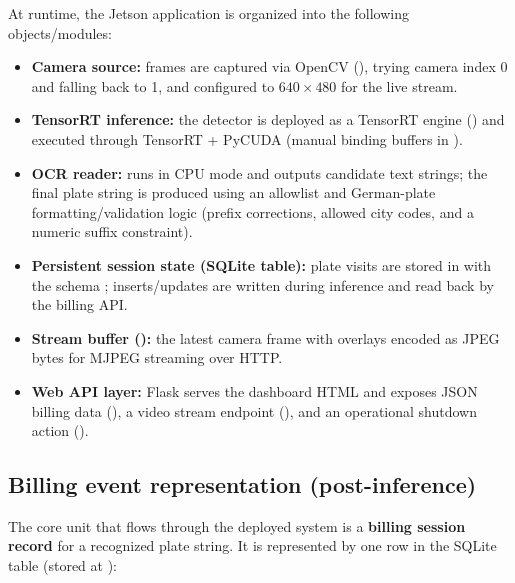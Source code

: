 \noindent
At runtime, the Jetson application is organized into the following objects/modules:
\begin{itemize}
	\item \textbf{Camera source:} frames are captured via OpenCV (), trying camera index 0 and falling back to 1, and configured to \(640\times480\) for the live stream.
	\item \textbf{TensorRT inference:} the detector is deployed as a TensorRT engine () and executed through TensorRT + PyCUDA (manual binding buffers in ).
	\item \textbf{OCR reader:}  runs in CPU mode and outputs candidate text strings; the final plate string is produced using an allowlist and German-plate formatting/validation logic (prefix corrections, allowed city codes, and a numeric suffix constraint).
	\item \textbf{Persistent session state (SQLite  table):} plate visits are stored in  with the schema ; inserts/updates are written during inference and read back by the billing API.
	\item \textbf{Stream buffer ():} the latest camera frame with overlays encoded as JPEG bytes for MJPEG streaming over HTTP.
	\item \textbf{Web API layer:} Flask serves the dashboard HTML and exposes JSON billing data (), a video stream endpoint (), and an operational shutdown action ().
\end{itemize}

\subsection{Billing event representation (post-inference)}

\noindent
The core unit that flows through the deployed system is a \textbf{billing session record} for a recognized plate string.
It is represented by one row in the SQLite  table (stored at ):

